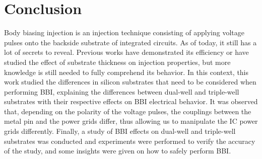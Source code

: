 \documentclass[10pt, conference, compsocconf]{IEEEtran}
\begin{document}
\section{Conclusion}
\label{section:concl}
Body biasing injection is an injection technique consisting of applying voltage pulses onto the backside substrate of integrated circuits. As of today, it still has a lot of secrets to reveal. Previous works have demonstrated its efficiency or have studied the effect of substrate thickness on injection properties, but more knowledge is still needed to fully comprehend its behavior. In this context, this work studied the differences in silicon substrates that need to be considered when performing BBI, explaining the differences between dual-well and triple-well substrates with their respective effects on BBI electrical behavior. It was observed that, depending on the polarity of the voltage pulses, the couplings between the metal pin and the power grids differ, thus allowing us to manipulate the IC power grids differently. Finally, a study of BBI effects on dual-well and triple-well substrates was conducted and experiments were performed to verify the accuracy of the study, and some insights were given on how to safely perform BBI.
\end{document}

